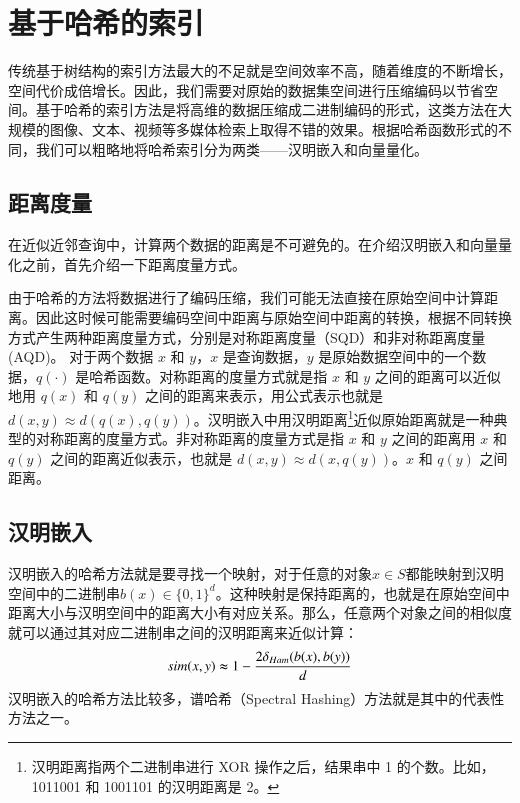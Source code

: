 \section{基于哈希的索引}
传统基于树结构的索引方法最大的不足就是空间效率不高，随着维度的不断增长，空间代价成倍增长。因此，我们需要对原始的数据集空间进行压缩编码以节省空间。基于哈希的索引方法是将高维的数据压缩成二进制编码的形式，这类方法在大规模的图像、文本、视频等多媒体检索上取得不错的效果。根据哈希函数形式的不同，我们可以粗略地将哈希索引分为两类——汉明嵌入和向量量化。

\subsection{距离度量}
在近似近邻查询中，计算两个数据的距离是不可避免的。在介绍汉明嵌入和向量量化之前，首先介绍一下距离度量方式。

由于哈希的方法将数据进行了编码压缩，我们可能无法直接在原始空间中计算距离。因此这时候可能需要编码空间中距离与原始空间中距离的转换，根据不同转换方式产生两种距离度量方式，分别是对称距离度量（SQD）和非对称距离度量(AQD)。
对于两个数据 $x$ 和 $y$，$x$ 是查询数据，$y$ 是原始数据空间中的一个数据，$q(\cdot)$ 是哈希函数。对称距离的度量方式就是指 $x$ 和 $y$ 之间的距离可以近似地用 $q(x)$ 和 $q(y)$ 之间的距离来表示，用公式表示也就是 $d(x,y) \approx d(q(x),q(y))$。汉明嵌入中用汉明距离\footnote{汉明距离指两个二进制串进行 XOR 操作之后，结果串中 1 的个数。比如，1011001 和 1001101 的汉明距离是 2。}近似原始距离就是一种典型的对称距离的度量方式。非对称距离的度量方式是指 $x$ 和 $y$ 之间的距离用 $x$ 和 $q(y)$ 之间的距离近似表示，也就是 $d(x,y) \approx d(x, q(y))$。$x$ 和 $q(y)$ 之间距离。
\subsection{汉明嵌入}
汉明嵌入的哈希方法就是要寻找一个映射，对于任意的对象$x \in S$都能映射到汉明空间中的二进制串$b(x) \in \{0,1\}^d$。这种映射是保持距离的，也就是在原始空间中距离大小与汉明空间中的距离大小有对应关系。那么，任意两个对象之间的相似度就可以通过其对应二进制串之间的汉明距离来近似计算：
\begin{equation}
sim(x, y)\thickapprox 1 - \frac{2\delta_{Ham}(b(x),b(y))}{d}
\end{equation}
汉明嵌入的哈希方法比较多，谱哈希（Spectral Hashing）\cite{WeissTF08}方法就是其中的代表性方法之一。
